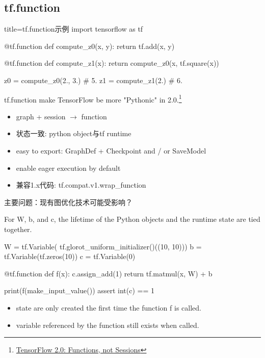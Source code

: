 
\subsection{tf.function}

\begin{frame}[fragile]
    \begin{tcblisting}{title=tf.function示例}
        import tensorflow as tf

        @tf.function
        def compute_z0(x, y):
          return tf.add(x, y)

        @tf.function
        def compute_z1(x):
          return compute_z0(x, tf.square(x))

        z0 = compute_z0(2., 3.)
        # 5.
        z1 = compute_z1(2.)
        # 6.
    \end{tcblisting}
\end{frame}

\begin{frame}[fragile]{tf.function}
    make TensorFlow be more "Pythonic" in 2.0.\footnote{\href{https://github.com/tensorflow/community/pull/20}{TensorFlow 2.0: Functions, not Sessions}}

    \begin{itemize}
        \item graph + session $\to$ function
        \item 状态一致: python object与tf runtime
        \item easy to export: GraphDef + Checkpoint and / or SaveModel
        \item enable eager execution by default
        \item 兼容1.x代码: tf.compat.v1.wrap\_function
    \end{itemize}

    主要问题：现有图优化技术可能受影响？
\end{frame}

\begin{frame}[fragile]
    For W, b, and c, the lifetime of the Python objects and the runtime state are tied together.

    \begin{tcblisting}{}
        W = tf.Variable(
            tf.glorot_uniform_initializer()((10, 10)))
        b = tf.Variable(tf.zeros(10))
        c = tf.Variable(0)

        @tf.function
        def f(x):
          c.assign_add(1)
          return tf.matmul(x, W) + b

        print(f(make_input_value())
        assert int(c) == 1
    \end{tcblisting}

    \begin{itemize}
        \item state are only created the first time the function f is called.
        \item variable referenced by the function still exists when called.
    \end{itemize}
\end{frame}

